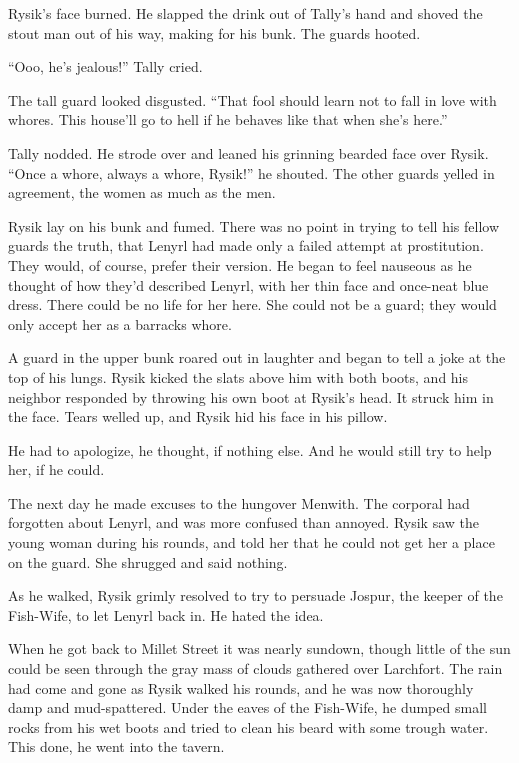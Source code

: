 \documentclass[10pt,a4paper]{article}
\begin{document}
Rysik's face burned. He slapped the drink out of Tally's hand
and shoved the stout man out of his way, making for his bunk.
The guards hooted.

``Ooo, he's jealous!'' Tally cried.

The tall guard looked disgusted. ``That fool should learn not to
fall in love with whores. This house'll go to hell if he behaves
like that when she's here.''

Tally nodded. He strode over and leaned his grinning bearded face
over Rysik. ``Once a whore, always a whore, Rysik!'' he shouted. The
other guards yelled in agreement, the women as much as the men.

Rysik lay on his bunk and fumed. There was no point in trying
to tell his fellow guards the truth, that Lenyrl had made only
a failed attempt at prostitution. They would, of course, prefer
their version. He began to feel nauseous as he thought of how they'd
described Lenyrl, with her thin face and once-neat blue dress. There
could be no life for her here. She could not be a guard; they would
only accept her as a barracks whore.

A guard in the upper bunk roared out in laughter and began to tell
a joke at the top of his lungs. Rysik kicked the slats above him
with both boots, and his neighbor responded by throwing his own
boot at Rysik's head. It struck him in the face. Tears welled up,
and Rysik hid his face in his pillow.

He had to apologize, he thought, if nothing else. And he would
still try to help her, if he could.

\bigskip

The next day he made excuses to the hungover Menwith. The corporal
had forgotten about Lenyrl, and was more confused than annoyed. Rysik
saw the young woman during his rounds, and told her that he could
not get her a place on the guard. She shrugged and said nothing.

As he walked, Rysik grimly resolved to try to persuade Jospur, the
keeper of the Fish-Wife, to let Lenyrl back in. He hated the idea.

When he got back to Millet Street it was nearly sundown, though
little of the sun could be seen through the gray mass of clouds
gathered over Larchfort. The rain had come and gone as Rysik walked
his rounds, and he was now thoroughly damp and mud-spattered.
Under the eaves of the Fish-Wife, he dumped small rocks from his
wet boots and tried to clean his beard with some trough water. This
done, he went into the tavern.
\end{document}

